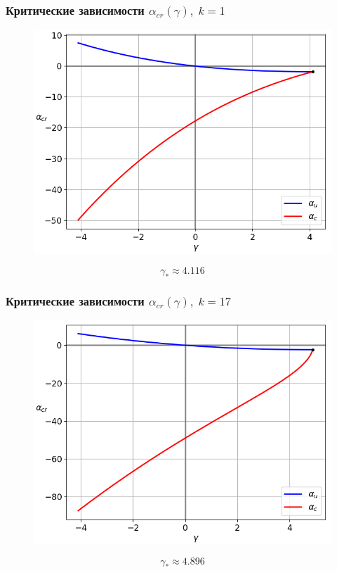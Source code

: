 \documentclass[fullscreen=true, unicode, bookmarks=false]{beamer}
\begin{document}
\begin{frame}
\frametitle{ Критические зависимости $ \alpha_{cr}(\gamma), \; k = 1 $ }

\begin{figure} 
\includegraphics[scale=0.55]{alphas_000.png}  
\end{figure}
$$ \gamma_* \approx 4.116 $$

\end{frame}

\begin{frame}
\frametitle{ Критические зависимости $ \alpha_{cr}(\gamma), \; k = 17 $ }

\begin{figure} 
\includegraphics[scale=0.55]{alphas_033.png}  
\end{figure}
$$ \gamma_* \approx 4.896 $$

\end{frame}
\end{document}
